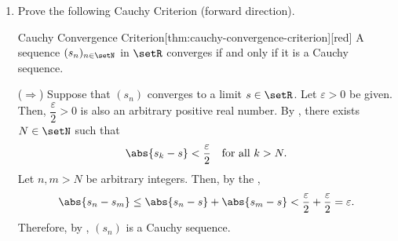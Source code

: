 \begin{enumerate}
\begin{subprove}
    \[
      \abs{s_n} \leq M \quad\text{for all } n \in \setN.
    \]
    Let \(\varepsilon > 0\) be given.
    Since \(M > 0\), it follows that \(\frac{\varepsilon}{2M} > 0\) is also an arbitrary positive real number.
    Thus, by definition, there exists \(N_1 \in \setN\) such that
    \[
      \abs{t_n - t} < \frac{\varepsilon}{2M} \quad\text{for all } n > N_1.
    \]
    Since \(\max\set{\abs{t}, 1} \geq 1 > 0\), it follows that \(\frac{\varepsilon}{2\max\set{\abs{t}, 1}} > 0\) 
    is also an arbitrary positive real number.
    Since \((s_n)\) converges to \(s\), by ,
    there exists \(N_2 \in \setN\) such that
    \[
      \abs{s_n - s} < \frac{\varepsilon}{2\max\set{\abs{t}, 1}} \quad\text{for all } n > N_2.
    \]
    Let \(N = \max\set{N_1, N_2}\). Then, for all \(n > N\), by ,
    \begin{align*}
      \abs{s_n t_n - s t} &= \abs{s_n t_n - s_n t + s_n t - s t} \\
      &= \abs{s_n(t_n - t) + t(s_n - s)} \\
      &\leq \abs{s_n}\abs{t_n - t} + \abs{t}\abs{s_n - s} \\
      &< M \cdot \frac{\varepsilon}{2M} + \abs{t} \cdot \frac{\varepsilon}{2\max\set{\abs{t}, 1}} \\
      &= \frac{\varepsilon}{2} + \frac{\abs{t}}{\max\set{\abs{t}, 1}} \cdot \frac{\varepsilon}{2} \\
      &\leq \frac{\varepsilon}{2} + \frac{\varepsilon}{2} = \varepsilon,
    \end{align*}
    Thus, by , \(\lim (s_n t_n) = s t\).
  \end{subprove}











  \newpage
  \item Prove the following Cauchy Criterion (forward direction).
  \begin{define}{Cauchy Convergence Criterion}[thm:cauchy-convergence-criterion][red]
    A sequence \((s_n)_{n\in\setN}\) in \(\setR\) converges if and only if it is a Cauchy sequence.
  \end{define}
  \begin{subprove}
    (\(\Rightarrow\)) Suppose that \((s_n)\) converges to a limit \(s \in \setR\).
    Let \(\varepsilon > 0\) be given. Then, \(\dfrac{\varepsilon}{2} > 0\) is also an arbitrary positive real number.
    By , there exists \(N \in \setN\) such that
    \[
      \abs{s_k - s} < \dfrac{\varepsilon}{2} \quad\text{for all } k > N.
    \]
    Let \(n, m > N\) be arbitrary integers. Then, by the ,
    \[
      \abs{s_n - s_m} \leq \abs{s_n - s} + \abs{s_m - s} < \dfrac{\varepsilon}{2} + \dfrac{\varepsilon}{2} = \varepsilon.
    \]
    Therefore, by , \((s_n)\) is a Cauchy sequence.


\end{subprove}
\end{enumerate}
